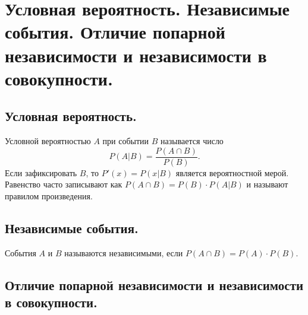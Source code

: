 \section{Условная вероятность. Независимые события. Отличие попарной независимости и независимости в совокупности.}

\subsection{Условная вероятность.}
Условной вероятностью $A$ при событии $B$ называется число $$P(A|B) = \frac{P(A \cap B)}{P(B)}.$$
Если зафиксировать $B$, то $P'(x) = P(x | B)$ является вероятностной мерой.
Равенство часто записывают как $P(A \cap B) = P(B) \cdot P(A | B)$ и называют правилом произведения.

\subsection{Независимые события.}
События $A$ и $B$ называются независимыми, если $P(A \cap B) = P(A) \cdot P(B)$.

\subsection{Отличие попарной независимости и независимости в совокупности.}
